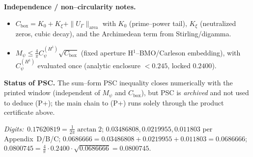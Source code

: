 \documentclass[10pt]{article}
\newcommand{\czero}{0.17620819} %
\newcommand{\CHone}{0.2400}     %
\newcommand{\Kzero}{0.03486808} %
\newcommand{\Kxi}{0.0219955}    %
\newcommand{\Ugam}{0.011803}    %
\newcommand{\Cbox}{0.0686666}   %
\newcommand{\Mpsi}{0.0800745}   %
\begin{document}
\textbf{Independence / non–circularity notes.}
\begin{itemize}
  \item $C_{\mathrm{box}}=K_0+K_\xi+\|U_\Gamma\|_{\mathrm{area}}$ with $K_0$ (prime–power tail), $K_\xi$ (neutralized zeros, cubic decay), and the Archimedean term from Stirling/digamma.
  \item $M_\psi\le \tfrac{4}{\pi}C_\psi^{(H^1)}\sqrt{C_{\mathrm{box}}}$ (fixed aperture H$^1$–BMO/Carleson embedding), with $C_\psi^{(H^1)}$ evaluated once (analytic enclosure $<0.245$, locked $0.2400$).
\end{itemize}

\textbf{Status of PSC.} The sum–form PSC inequality closes numerically with the printed window (independent of $M_\psi$ and $C_{\mathrm{box}}$), but PSC is \emph{archived} and not used to deduce (P+); the main chain to (P+) runs solely through the product certificate above.

\vfill
\noindent\textit{Digits:}\ $\czero=\tfrac{1}{2\pi}\arctan 2$; $\Kzero,\Kxi,\Ugam$ per Appendix~D/B/C; $\Cbox=\Kzero+\Kxi+\Ugam=\Cbox$; $\Mpsi=\tfrac{4}{\pi}\cdot\CHone\cdot\sqrt{\Cbox}=\Mpsi$.
\end{document}
